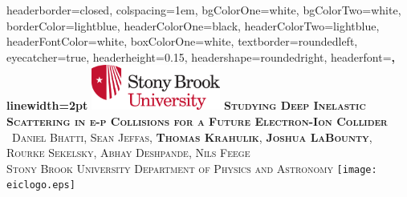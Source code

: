 \documentclass[landscape,a0paper,fontscale=0.290]{baposter} %
\begin{document}
\begin{poster}
{
headerborder=closed, %
colspacing=1em, %
bgColorOne=white, %
bgColorTwo=white, %
borderColor=lightblue, %
headerColorOne=black, %
headerColorTwo=lightblue, %
headerFontColor=white, %
boxColorOne=white, %
textborder=roundedleft, %
eyecatcher=true, %
headerheight=0.15\textheight, %
headershape=roundedright, %
headerfont=\Large\bf\textsc, %
linewidth=2pt %
}
%
{\includegraphics[height=4em]{SB_Logo.png}} %
{\bf\textsc{Studying Deep Inelastic Scattering in e-p Collisions for a Future Electron-Ion Collider}\vspace{0.5em}} %
{\textsc{\ Daniel Bhatti, Sean Jeffas, \textbf{Thomas Krahulik}, \textbf{Joshua LaBounty}, \\ Rourke Sekelsky, Abhay Deshpande, Nils Feege \\ Stony Brook University Department of Physics and Astronomy}}%
{\hspace{10mm} \texttt{[image: eiclogo.eps]}} %



\end{poster}
\end{document}
